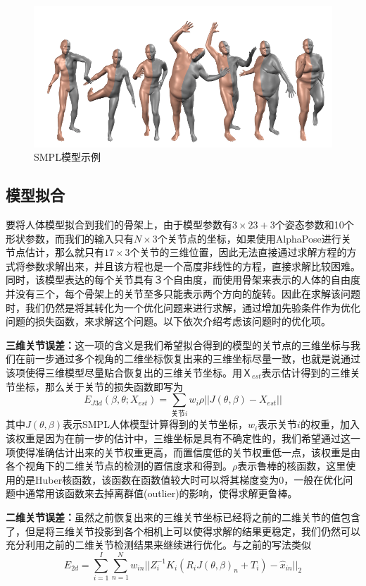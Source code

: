 \begin{figure}[htbp]
    \centering
    \includegraphics[width=0.8\linewidth]{figure/proposal/smpl}
    \caption{\label{fig:smplsample} SMPL模型示例}
\end{figure}

\subsection{模型拟合}
要将人体模型拟合到我们的骨架上，由于模型参数有\(3\times 23 + 3\)个姿态参数和10个形状参数，而我们的输入只有\(N \times 3\)个关节点的坐标，如果使用AlphaPose进行关节点估计，那么就只有\(17 \times 3\)个关节的三维位置，因此无法直接通过求解方程的方式将参数求解出来，并且该方程也是一个高度非线性的方程，直接求解比较困难。同时，该模型表达的每个关节具有３个自由度，而使用骨架来表示的人体的自由度并没有三个，每个骨架上的关节至多只能表示两个方向的旋转。因此在求解该问题时，我们仍然是将其转化为一个优化问题来进行求解，通过增加先验条件作为优化问题的损失函数，来求解这个问题。以下依次介绍考虑该问题时的优化项。

\textbf{三维关节误差：}这一项的含义是我们希望拟合得到的模型的关节点的三维坐标与我们在前一步通过多个视角的二维坐标恢复出来的三维坐标尽量一致，也就是说通过该项使得三维模型尽量贴合恢复出的三维关节坐标。用\(Ｘ_{est}\)表示估计得到的三维关节坐标，那么关于关节的损失函数即写为
\begin{equation}
    E_{J3d}(\beta, \theta; X_{est}) = \sum_{\text{关节}i}w_i\rho||J(\theta, \beta) - X_{est}||
\end{equation}
其中\(J(\theta, \beta)\)表示SMPL人体模型计算得到的关节坐标，\(w_i\)表示关节\(i\)的权重，加入该权重是因为在前一步的估计中，三维坐标是具有不确定性的，我们希望通过这一项使得准确估计出来的关节权重更高，而置信度低的关节权重低一点，该权重是由各个视角下的二维关节点的检测的置信度求和得到。\(\rho\)表示鲁棒的核函数，这里使用的是Huber核函数，该函数在函数值较大时可以将其梯度变为0，一般在优化问题中通常用该函数来去掉离群值(outlier)的影响，使得求解更鲁棒。

\textbf{二维关节误差：}虽然之前恢复出来的三维关节坐标已经将之前的二维关节的值包含了，但是将三维关节投影到各个相机上可以使得求解的结果更稳定，我们仍然可以充分利用之前的二维关节检测结果来继续进行优化。与之前的写法类似
\begin{equation}
    E_{2d} = \sum^I_{i=1} \sum_{n=1}^N w_{in}||Z_i^{-1}K_i(R_iJ(\theta, \beta)_n + T_i) - \hat x_{in}||_2
\end{equation}

